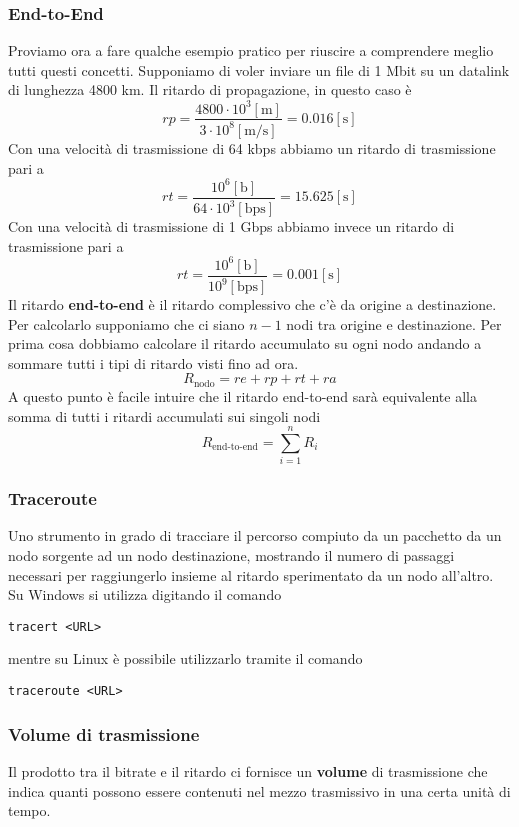 \subsubsection{End-to-End}
Proviamo ora a fare qualche esempio pratico per riuscire a comprendere 
meglio tutti questi concetti. Supponiamo di voler inviare un file di 
1 Mbit su un datalink di lunghezza 4800 km. Il ritardo di propagazione,
in questo caso è
\[
	rp = \frac{4800 \cdot 10^3 [\text{m}]}{3 \cdot 
	10^8 [\text{m/s}]} = 0.016 [\text{s}]
\]
Con una velocità di trasmissione di 64 kbps abbiamo un ritardo di
trasmissione pari a
\[ 
	rt = \frac{10^6 [\text{b}]}{64 \cdot 10^3 [\text{bps}]} = 
	15.625 [\text{s}]
\]
Con una velocità di trasmissione di 1 Gbps abbiamo invece un ritardo di
trasmissione pari a
\[ rt = \frac{10^6 [\text{b}]}{10^9 [\text{bps}]} = 0.001 [\text{s}] \]
Il ritardo \textbf{end-to-end} è il ritardo complessivo che c'è da 
origine a destinazione. Per calcolarlo supponiamo che ci siano $n-1$
nodi tra origine e destinazione. Per prima cosa dobbiamo calcolare il 
ritardo accumulato su ogni nodo andando a sommare tutti i tipi di 
ritardo visti fino ad ora.
\[ R_{\text{nodo}} = re + rp + rt + ra \]
A questo punto è facile intuire che il ritardo end-to-end sarà 
equivalente alla somma di tutti i ritardi accumulati sui singoli nodi
\[ R_\text{end-to-end} = \sum_{i=1}^n R_i \]

\subsubsection{Traceroute}
Uno strumento in grado di tracciare il percorso compiuto da un 
pacchetto da un nodo sorgente ad un nodo destinazione, mostrando il 
numero di passaggi necessari per raggiungerlo insieme al ritardo 
sperimentato da un nodo all'altro. Su Windows si utilizza digitando 
il comando
\begin{center}
	\verb|tracert <URL>|
\end{center}
mentre su Linux è possibile utilizzarlo tramite il comando 
\begin{center}
	\verb|traceroute <URL>|
\end{center}

\subsubsection{Volume di trasmissione}
Il prodotto tra il bitrate e il ritardo ci fornisce un \textbf{volume} 
di trasmissione che indica quanti possono essere contenuti nel mezzo 
trasmissivo in una certa unità di tempo.

